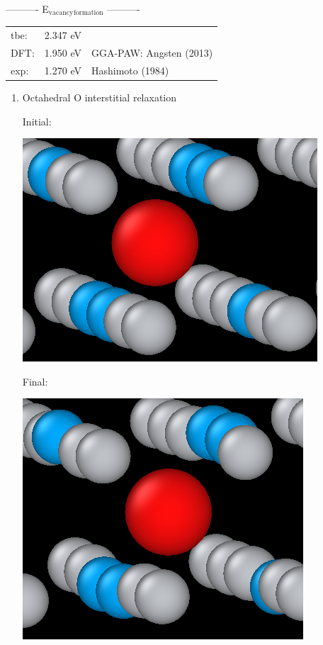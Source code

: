 \documentclass[11pt]{article}
\begin{document}
\begin{enumerate}
----------     E\(_{\text{vacancy}}\)\(_{\text{formation}}\)     ----------

\begin{center}
\begin{tabular}{lll}
tbe: & 2.347  eV & \\
DFT: & 1.950  eV & GGA-PAW:   Angsten  (2013)\\
exp: & 1.270  eV & Hashimoto  (1984)\\
\end{tabular}
\end{center}

\begin{enumerate}
\item Octahedral O interstitial relaxation
\label{sec:org5e291e3}

Initial:
\begin{center}
\includegraphics[width=.9\linewidth]{Images/initial_octahedral_ox_ovito.png}
\end{center}

Final:
\begin{center}
\includegraphics[width=.9\linewidth]{Images/final_octahedral_ox_ovito.png}
\end{center}


\end{enumerate}
\end{enumerate}
\end{document}
